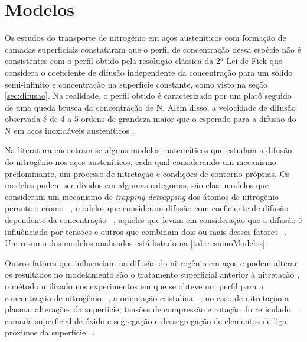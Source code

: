 \documentclass[]{politex}
\begin{document}
\section{Modelos}
	Os estudos do transporte de nitrogênio em aços austeníticos com formação de camadas superficiais constataram que o perfil de concentração dessa espécie não é consistentes com o perfil obtido pela resolução clássica da 2$^a$ Lei de Fick que considera o coeficiente de difusão independente da concentração para um sólido semi-infinito e concentração na superfície constante, como visto na seção \autoref{sec:difusao}. Na realidade, o perfil obtido é caracterizado por um platô seguido de uma queda brusca da concentração de N. Além disso, a velocidade de difusão observada é de 4 a 5 ordens de grandeza maior que o esperado para a difusão do N em aços inoxidáveis austeníticos \cite{parascandola2000nitrogen}. \par
	Na literatura encontram-se alguns modelos matemáticos que estudam a difusão do nitrogênio nos aços austeníticos, cada qual considerando um mecanismo predominante, um processo de nitretação e condições de contorno próprias. Os modelos podem ser dividos em algumas categorias, são elas: modelos que consideram um mecanismo de \textit{trapping-detrapping} dos átomos de nitrogênio perante o cromo ~\cite{parascandola2000nitrogen, moller2001surface, moskalioviene2011modeling}, modelos que consideram difusão com coeficiente de difusão dependente da concentração ~\cite{mandl2002concentration, mandl2003nitrogen}, aqueles que levam em consideração que a difusão é influênciada por tensões \cite{galdikas2010stress} e outros que combinam dois ou mais desses fatores ~\cite{christiansen2008nitrogen, moskalioviene2012stress}. Um resumo dos modelos analisados está listado na \autoref{tab:resumoModelos}.\par
	Outros fatores que influenciam na difusão do nitrogênio em aços e podem alterar os resultados no modelamento são o tratamento superficial anterior à nitretação \cite{baranowska2010importance}, o método utilizado nos experimentos em que se obteve um perfil para a concentração de nitrogênio ~\cite{moskalioviene2011modeling}, a orientação cristalina ~\cite{moskalioviene2011modeling}, no caso de nitretação a plasma:  alterações da superfície, tensões de compressão e rotação do reticulado  ~\cite{moskalioviene2011modeling}, camada superficial de óxido e segregação e dessegregação de elementos de liga próximos da superfície ~\cite{mandl2002concentration}.
	
\end{document}
